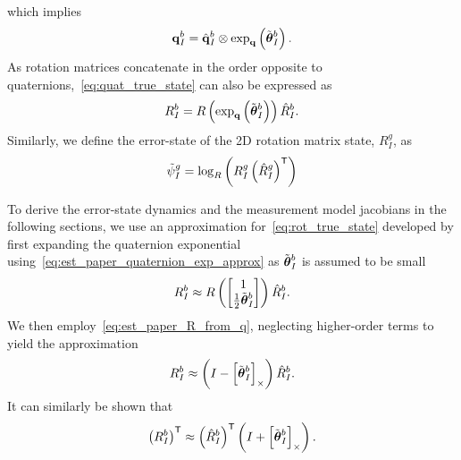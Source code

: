 which implies
\begin{equation}
  \boldsymbol{\mathrm{q}}_I^b  = \hat{\boldsymbol{\mathrm{q}}}_I^b \otimes \exp_{\boldsymbol{\mathrm{q}}} \left( \tilde{\boldsymbol{\mathrm{\theta}}}_I^b
  \right).
  \label{eq:quat_true_state}
\end{equation}
As rotation matrices concatenate in the order opposite to
quaternions,~\eqref{eq:quat_true_state} can also be expressed as
\begin{equation}
  R_I^b  = R \left( \exp_{\boldsymbol{\mathrm{q}}} \left( \tilde{\boldsymbol{\mathrm{\theta}}}_I^b \right) \right)
  \hat{R}_I^b.
  \label{eq:rot_true_state}
\end{equation}
Similarly, we define the error-state of the 2D rotation matrix state, $R_I^g$,
as
\begin{equation}
  \tilde{\psi}_I^g = \log_R \left(  
  R_I^g \left( \hat{R}_I^g \right)^{\mathsf{T}} \right)
  \label{eq:2d_rot_err_state}
\end{equation}

To derive the error-state dynamics and the measurement model jacobians in the
following sections, we
use an approximation for~\eqref{eq:rot_true_state} developed by first expanding
the
quaternion exponential using~\eqref{eq:est_paper_quaternion_exp_approx} as
$\tilde{\boldsymbol{\mathrm{\theta}}}_I^b$ is assumed to be small
\begin{equation}
  R_I^b  \approx R \left( \begin{bmatrix}
      1 \\
    \frac{1}{2} \tilde{\boldsymbol{\mathrm{\theta}}}_I^b
  \end{bmatrix}\right)
  \hat{R}_I^b.
\end{equation}
We then employ~\eqref{eq:est_paper_R_from_q}, neglecting higher-order terms to
yield the approximation
\begin{equation}
  R_I^b  \approx 
  \left( I - \left[ \tilde{\boldsymbol{\mathrm{\theta}}}_I^b \right]_{\times} \right)
  \hat{R}_I^b.
  \label{eq:est_paper_Rapprox}
\end{equation}
It can similarly be shown that
\begin{equation}
  \left( R_I^b \right)^{\mathsf{T}}  \approx 
  \left( \hat{R}_I^b \right)^{\mathsf{T}}
  \left( I + \left[ \tilde{\boldsymbol{\mathrm{\theta}}}_I^b \right]_{\times} \right).
  \label{eq:est_paper_RTapprox}
\end{equation}




